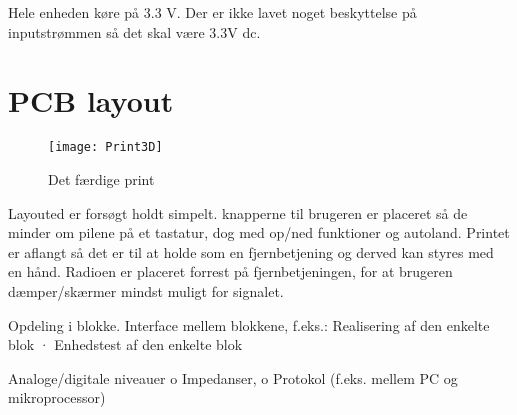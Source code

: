 \documentclass[Main]{subfiles}
\begin{document}
Hele enheden køre på 3.3 V.
Der er ikke lavet noget beskyttelse på inputstrømmen så det skal være 3.3V dc.

\section{PCB layout}

\begin{figure}[H]
\centering
\texttt{[image: Print3D]}
\caption{Det færdige print}
\label{fig: Print3D}
\end{figure}

Layouted er forsøgt holdt simpelt. knapperne til brugeren er placeret så de minder om pilene på et tastatur, dog med op/ned funktioner og autoland.
Printet er aflangt så det er til at holde som en fjernbetjening og derved kan styres med en hånd.
Radioen er placeret forrest på fjernbetjeningen, for at brugeren dæmper/skærmer mindst muligt for signalet.  

Opdeling i blokke.
Interface mellem blokkene, f.eks.:
Realisering af den enkelte blok
· Enhedstest af den enkelte blok

Analoge/digitale niveauer
o Impedanser,
o Protokol (f.eks. mellem PC og mikroprocessor)
\end{document}
